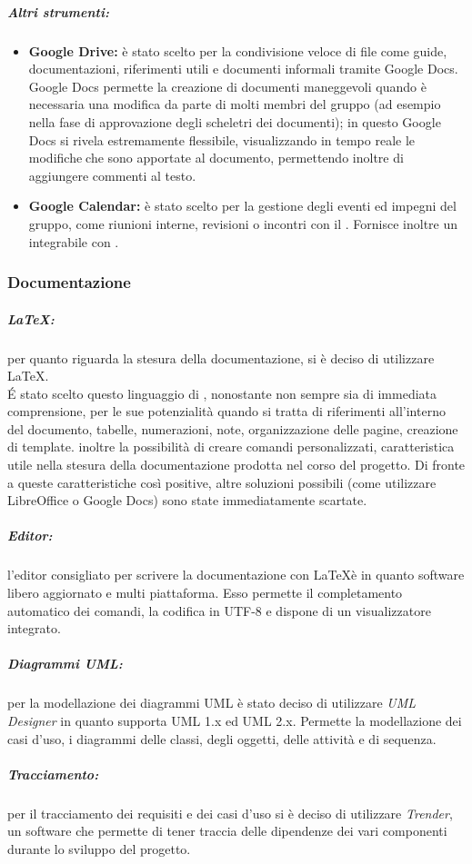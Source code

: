 
\subparagraph{Altri strumenti:}
		\begin{itemize}
			\item \textbf{Google Drive:} è stato scelto per la condivisione veloce di file come guide, documentazioni, riferimenti utili e documenti informali tramite
			Google Docs. Google Docs permette la creazione di documenti
			maneggevoli quando è necessaria una modifica da parte di molti membri
			del gruppo (ad esempio nella fase di approvazione degli scheletri dei
			documenti); in questo Google Docs si rivela estremamente flessibile,
			visualizzando in tempo reale le modificheche sono apportate al documento,
			permettendo inoltre di aggiungere commenti al testo.
			\item \textbf{Google Calendar:} è stato scelto per la gestione degli eventi ed
			impegni del gruppo, come riunioni interne, revisioni o incontri con il . Fornisce inoltre un  integrabile con .
		\end{itemize}
	
	\subsubsection{Documentazione}
	\subparagraph{\LaTeX:} per quanto riguarda la stesura della documentazione, si è deciso di utilizzare \LaTeX. \\
		\'{E}	stato scelto questo linguaggio di , nonostante
		non sempre sia di immediata comprensione, per le sue potenzialità quando
		si tratta di riferimenti all'interno del documento, tabelle, numerazioni,
		note, organizzazione delle pagine, creazione di template. inoltre
		la possibilità di creare comandi personalizzati, caratteristica utile nella
		stesura della documentazione prodotta nel corso del progetto. Di fronte a
		queste caratteristiche così positive, altre soluzioni possibili (come utilizzare
		LibreOffice o Google Docs) sono state immediatamente scartate.
	\subparagraph{Editor:} l'editor consigliato per scrivere la documentazione con \LaTeX è
		 in quanto software libero aggiornato e multi piattaforma. Esso
		permette il completamento automatico dei comandi, la codifica in UTF-8 e
		dispone di un visualizzatore  integrato.
	\subparagraph{Diagrammi UML:} per la modellazione dei diagrammi UML è stato deciso di utilizzare 	\emph{UML Designer} in quanto supporta UML 1.x ed UML 2.x. Permette la modellazione dei casi d'uso, i 	diagrammi delle classi, degli oggetti, delle attività	e di sequenza.
	\subparagraph{Tracciamento:} per il tracciamento dei requisiti e dei casi d'uso si è deciso di utilizzare \emph{Trender}, un software che permette di tener traccia delle dipendenze dei vari componenti durante lo sviluppo del progetto.
	

